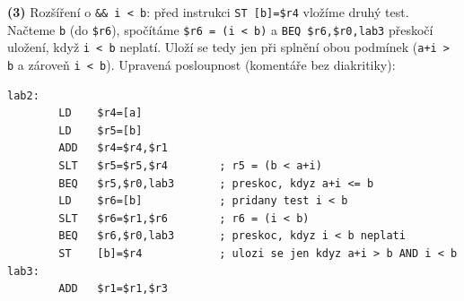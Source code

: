 \medskip
\noindent\textbf{(3)} Rozšíření o \texttt{\&\& i < b}: před instrukci
\texttt{ST [b]=\$r4} vložíme druhý test. Načteme \texttt{b} (do \texttt{\$r6}),
spočítáme \texttt{\$r6 = (i < b)} a \texttt{BEQ \$r6,\$r0,lab3} přeskočí uložení,
když \texttt{i < b} neplatí. Uloží se tedy jen při splnění obou podmínek
(\texttt{a+i > b} a zároveň \texttt{i < b}). Upravená posloupnost (komentáře bez
diakritiky):
\begin{lstlisting}
lab2:
        LD    $r4=[a]
        LD    $r5=[b]
        ADD   $r4=$r4,$r1
        SLT   $r5=$r5,$r4        ; r5 = (b < a+i)
        BEQ   $r5,$r0,lab3       ; preskoc, kdyz a+i <= b
        LD    $r6=[b]            ; pridany test i < b
        SLT   $r6=$r1,$r6        ; r6 = (i < b)
        BEQ   $r6,$r0,lab3       ; preskoc, kdyz i < b neplati
        ST    [b]=$r4            ; ulozi se jen kdyz a+i > b AND i < b
lab3:
        ADD   $r1=$r1,$r3
\end{lstlisting}
